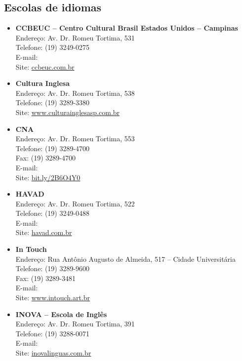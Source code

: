 \subsection{Escolas de idiomas}

\begin{itemize}
\item \textbf{CCBEUC -- Centro Cultural Brasil Estados Unidos -- Campinas}
  \\Endereço: Av. Dr. Romeu Tortima, 531
  \\Telefone: (19) 3249-0275
  \\E-mail: 
  \\Site: \url{ccbeuc.com.br}

\item \textbf{Cultura Inglesa}
  \\Endereço: Av. Dr. Romeu Tortima, 538
  \\Telefone: (19) 3289-3380
  \\Site: \url{www.culturainglesasp.com.br}

\item \textbf{CNA}
  \\Endereço: Av. Dr. Romeu Tortima, 553
  \\Telefone: (19) 3289-4700
  \\Fax: (19) 3289-4700
  \\E-mail: 
  \\Site: \url{bit.ly/2B6O4Y0}

\item \textbf{HAVAD}
  \\Endereço: Av. Dr. Romeu Tortima, 522
  \\Telefone: (19) 3249-0488
  \\E-mail: 
  \\Site: \url{havad.com.br}

\item \textbf{In Touch}
  \\Endereço: Rua Antônio Augusto de Almeida, 517 -- Cidade Universitária
  \\Telefone: (19) 3289-9600
  \\Fax: (19) 3289-3481
  \\E-mail: 
  \\Site: \url{www.intouch.art.br}

\item \textbf{INOVA -- Escola de Inglês}
  \\Endereço: Av. Dr. Romeu Tortima, 391
  \\Telefone: (19) 3288-0071
  \\E-mail: 
  \\Site: \url{inovalinguas.com.br}


\end{itemize}
